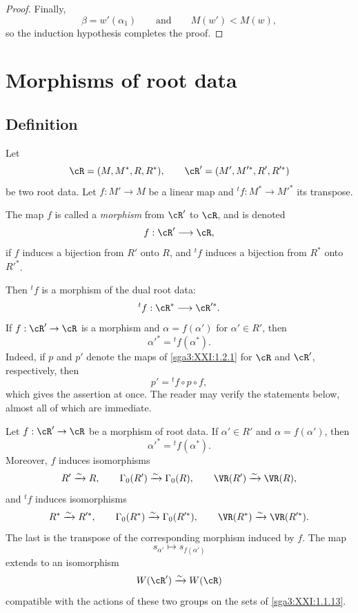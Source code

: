 \begin{proof}
Finally,
\[
 \beta=w'(\alpha_1)
 \qquad\text{and}\qquad
 M(w')<M(w),
\]
so the induction hypothesis completes the proof.
\end{proof}


\section{Morphisms of root data}\label{sga3:XXI:6}
\renewcommand{\thetheorem}{\thesubsection.\arabic{theorem}}

\subsection{Definition}\label{sga3:XXI:6.1}

Let
\[
 \cR=(M,M^\ast,R,R^\ast),
 \qquad
 \cR'=(M',M'^\ast,R',R'^\ast)
\]
be two root data. Let \(f:M'\to M\) be a linear map and
\({}^tf:M^\ast\to M'^\ast\) its transpose.

\begin{definition}\label{sga3:XXI:6.1.1}
The map \(f\) is called a \emph{morphism} from \(\cR'\) to \(\cR\),
and is denoted
\[
 f:\cR'\longrightarrow\cR,
\]
if \(f\) induces a bijection from \(R'\) onto \(R\), and
\({}^tf\) induces a bijection from \(R^\ast\) onto \(R'^\ast\).
\end{definition}

Then \({}^tf\) is a morphism of the dual root data:
\[
 {}^tf:\cR^\ast\longrightarrow\cR'^\ast.
\]
If \(f:\cR'\to\cR\) is a morphism and
\(\alpha=f(\alpha')\) for \(\alpha'\in R'\), then
\[
 \alpha'^\ast={}^tf(\alpha^\ast).
\]
Indeed, if \(p\) and \(p'\) denote the maps of
\ref{sga3:XXI:1.2.1} for \(\cR\) and \(\cR'\), respectively, then
\[
 p'={}^tf\circ p\circ f,
\]
which gives the assertion at once. The reader may verify the
statements below, almost all of which are immediate.

\begin{proposition}\label{sga3:XXI:6.1.2}
Let \(f:\cR'\to\cR\) be a morphism of root data. If
\(\alpha'\in R'\) and \(\alpha=f(\alpha')\), then
\[
 \alpha'^\ast={}^tf(\alpha^\ast).
\]
Moreover, \(f\) induces isomorphisms
\[
 R'\xrightarrow{\sim}R,\qquad
 \Gamma_0(R')\xrightarrow{\sim}\Gamma_0(R),\qquad
 \VR(R')\xrightarrow{\sim}\VR(R),
\]
and \({}^tf\) induces isomorphisms
\[
 R^\ast\xrightarrow{\sim}R'^\ast,\qquad
 \Gamma_0(R^\ast)\xrightarrow{\sim}\Gamma_0(R'^\ast),\qquad
 \VR(R^\ast)\xrightarrow{\sim}\VR(R'^\ast).
\]
The last is the transpose of the corresponding morphism induced by
\(f\). The map
\[
 s_{\alpha'}\longmapsto s_{f(\alpha')}
\]
extends to an isomorphism
\[
 W(\cR')\xrightarrow{\sim}W(\cR)
\]
compatible with the actions of these two groups on the sets of
\ref{sga3:XXI:1.1.13}.
\end{proposition}

